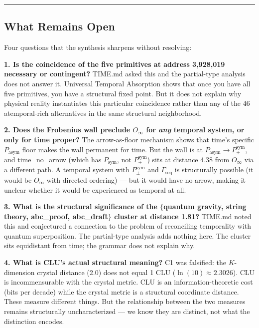 \documentclass[12pt,a4paper]{article}
\begin{document}
\begin{center}
\rule{0.5\textwidth}{0.4pt}
\end{center}

\subsection{What Remains Open}

Four questions that the synthesis sharpens without resolving:

\textbf{1. Is the coincidence of the five primitives at address 3,928,019 necessary or contingent?} TIME.md asked this and the partial-type analysis does not answer it. Universal Temporal Absorption shows that once you have all five primitives, you have a structural fixed point. But it does not explain why physical reality instantiates this particular coincidence rather than any of the 46 atemporal-rich alternatives in the same structural neighborhood.

\textbf{2. Does the Frobenius wall preclude $O_{\infty}$ for \emph{any} temporal system, or only for time proper?} The arrow-as-floor mechanism shows that time's specific $P_\text{asym}$ floor makes the wall permanent for time. But the wall is at $P_\text{asym} \to P_{\pm}^{\text{sym}}$, and time\_no\_arrow (which has $P_\text{sym}$, not $P_{\pm}^{\text{sym}}$) sits at distance 4.38 from $O_{\infty}$ via a different path. A temporal system with $P_{\pm}^{\text{sym}}$ and $\Gamma_\text{seq}$ is structurally possible (it would be $O_{\infty}$ with directed ordering) --- but it would have no arrow, making it unclear whether it would be experienced as temporal at all.

\textbf{3. What is the structural significance of the $\{$quantum gravity, string theory, abc\_proof, abc\_draft$\}$ cluster at distance 1.81?} TIME.md noted this and conjectured a connection to the problem of reconciling temporality with quantum superposition. The partial-type analysis adds nothing here. The cluster sits equidistant from time; the grammar does not explain why.

\textbf{4. What is CLU's actual structural meaning?} C1 was falsified: the $K$-dimension crystal distance (2.0) does not equal 1 CLU ($\ln(10) \approx 2.3026$). CLU is incommensurable with the crystal metric. CLU is an information-theoretic cost (bits per decade) while the crystal metric is a structural coordinate distance. These measure different things. But the relationship between the two measures remains structurally uncharacterized --- we know they are distinct, not what the distinction encodes.
\end{document}
